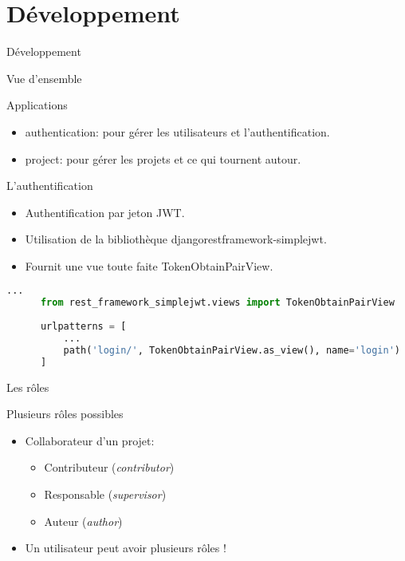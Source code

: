 \section{Développement}

\begin{frame}{Développement}  
\end{frame}

\begin{frame}{Vue d'ensemble}
  \begin{block}{Applications}
    \begin{itemize}
    \item \textsf{authentication}: pour gérer les utilisateurs et
      l'authentification.
    \item \textsf{project}: pour gérer les projets et ce qui tournent
      autour.
    \end{itemize}
  \end{block}
\end{frame}

\begin{frame}[fragile]{L'authentification}
  \begin{itemize}
  \item Authentification par jeton JWT.
  \item Utilisation de la bibliothèque
    \textsf{djangorestframework-simplejwt}.
  \item Fournit une vue toute faite \textsf{TokenObtainPairView}.
  \end{itemize}

  \begin{center}
    \tiny
    \begin{lstlisting}[language=python]
      ...
      from rest_framework_simplejwt.views import TokenObtainPairView
      
      urlpatterns = [
          ...
          path('login/', TokenObtainPairView.as_view(), name='login')    
      ]
    \end{lstlisting}
  \end{center}
\end{frame}

\begin{frame}{Les rôles}
  \begin{block}{Plusieurs rôles possibles}
    \begin{itemize}
    \item Collaborateur d'un projet:
      \begin{itemize}
      \item Contributeur (\textit{contributor})
      \item Responsable (\textit{supervisor})
      \item Auteur (\textit{author})
      \end{itemize}
    \item Un utilisateur peut avoir plusieurs rôles !
    \end{itemize}
  \end{block}
\end{frame}

